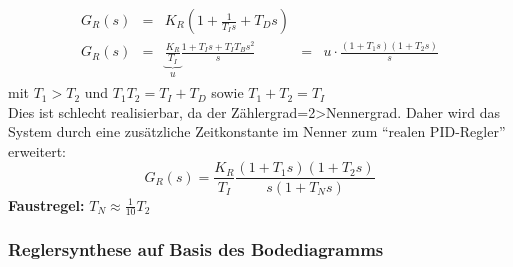 \documentclass[12pt,a4paper,ngerman]{scrartcl}
\begin{document}
\begin{align*}
  \begin{array}{lllll}
    G_R(s)&=&K_R(1+\frac{1}{T_Is}+T_Ds)\\
    G_R(s)&=&\underbrace{\frac{K_R}{T_I}}_{u}\frac{1+T_Is+T_IT_Bs^2}{s}&=&u\cdot \frac{(1+T_1s)(1+T_2s)}{s}
  \end{array}
\end{align*}
mit $T_1>T_2$ und $T_1T_2=T_I+T_D$ sowie $T_1+T_2=T_I$\\
Dies ist schlecht realisierbar, da der Zählergrad=2>Nennergrad. Daher wird das System durch eine zusätzliche Zeitkonstante im Nenner zum ``realen PID-Regler'' erweitert:
\[
G_R(s)=\frac{K_R}{T_I}\frac{(1+T_1s)(1+T_2s)}{s(1+T_Ns)}
\] 
\textbf{Faustregel:} $T_N \approx \frac{1}{10}T_2$


\subsubsection{Reglersynthese auf Basis des Bodediagramms}
\end{document}
